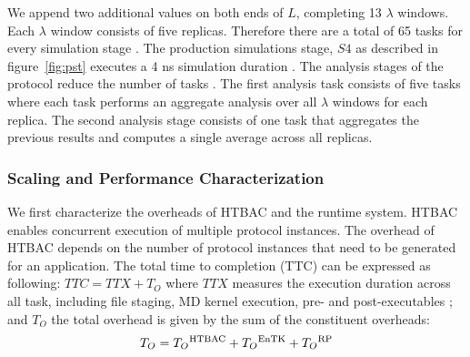We append two additional values on both ends of $L$, completing 13 $\lambda$
windows. Each $\lambda$ window consists of five replicas. Therefore there are
a total of 65 tasks for every simulation stage . The production simulations stage, $S4$ as described
in figure~\ref{fig:pst} executes a 4 ns simulation
duration . The analysis stages of the protocol reduce the number of
tasks . The first analysis task consists of five tasks where
each task performs an aggregate analysis over all $\lambda$ windows for each
replica. The second analysis stage consists of one task that aggregates the
previous results and computes a single average across all replicas.

\subsubsection{Scaling and Performance Characterization}


We first characterize the overheads of HTBAC and the runtime system. HTBAC
enables concurrent execution of multiple protocol  instances. The overhead of HTBAC depends  on the
number of protocol instances that need to be generated for an application.
The total time to completion (TTC)  can be expressed as
following: $TTC = TTX + T_{O}$ where \(TTX\) measures the execution duration
across all task, including file staging, MD kernel execution, pre- and
post-executables ; and $T_{O}$ the total overhead is  given by the sum of the constituent
overheads: $$T_{O} = T_{O}\textsuperscript{HTBAC} +
T_{O}\textsuperscript{EnTK} + T_{O}\textsuperscript{RP}$$ 


